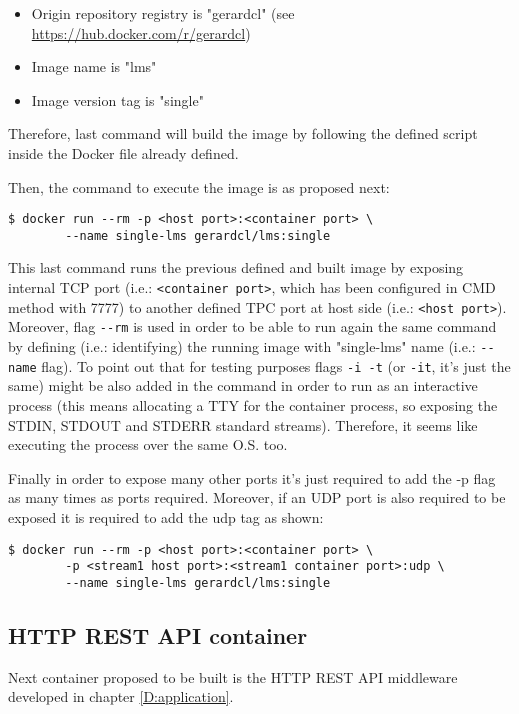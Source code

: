 \begin{itemize}
\item Origin repository registry is "gerardcl" (see \url{https://hub.docker.com/r/gerardcl})
\item Image name is "lms"
\item Image version tag is "single"
\end{itemize}

Therefore, last command will build the image by following the defined script inside the Docker file already defined.

Then, the command to execute the image is as proposed next:

\begin{verbatim}
$ docker run --rm -p <host port>:<container port> \
		--name single-lms gerardcl/lms:single
\end{verbatim}

This last command runs the previous defined and built image by exposing internal TCP port (i.e.: \verb|<container port>|, which has been configured in CMD method with 7777) to another defined TPC port at host side (i.e.: \verb|<host port>|). Moreover, flag \verb|--rm| is used in order to be able to run again the same command by defining (i.e.: identifying) the running image with "single-lms" name (i.e.: \verb|--name| flag). To point out that for testing purposes flags \verb|-i -t| (or \verb|-it|, it's just the same) might be also added in the command in order to run as an interactive process (this means allocating a TTY for the container process, so exposing the STDIN, STDOUT and STDERR standard streams). Therefore, it seems like executing the process over the same O.S. too.

Finally in order to expose many other ports it's just required to add the -p flag as many times as ports required. Moreover, if an UDP port is also required to be exposed it is required to add the udp tag as shown:

\begin{verbatim}
$ docker run --rm -p <host port>:<container port> \
		-p <stream1 host port>:<stream1 container port>:udp \
		--name single-lms gerardcl/lms:single
\end{verbatim}


\subsection{HTTP REST API container}

Next container proposed to be built is the HTTP REST API middleware developed in chapter \ref{D:application}.  

